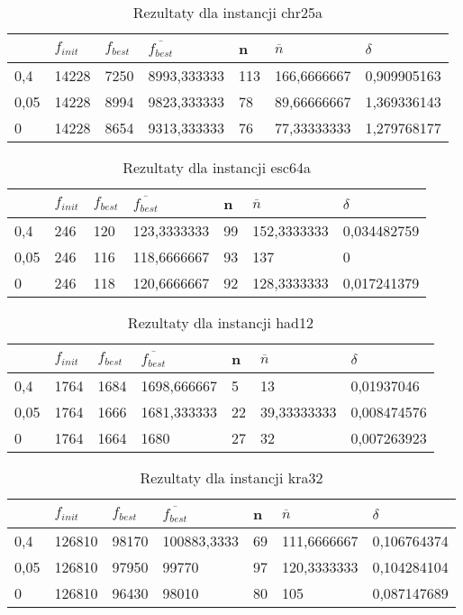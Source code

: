 \begin{table}[H]
\label{T4_chr25a}
\begin{tabular}{l l l l l l l}
\hline
 & $f_{init}$ & $f_{best}$ & $\overline{f_{best}}$ & n & $\overline{n}$ & $\delta$ \\
\hline
0,4 & 14228 & 7250 & 8993,333333 & 113 & 166,6666667 & 0,909905163\\
0,05 & 14228 & 8994 & 9823,333333 & 78 & 89,66666667 & 1,369336143\\
0 & 14228 & 8654 & 9313,333333 & 76 & 77,33333333 & 1,279768177\\
\hline
\end{tabular}
\caption{Rezultaty dla instancji chr25a}
\end{table}

\begin{table}[H]
\label{T4_esc64a}
\begin{tabular}{l l l l l l l}
\hline
 & $f_{init}$ & $f_{best}$ & $\overline{f_{best}}$ & n & $\overline{n}$ & $\delta$ \\
\hline
0,4 & 246 & 120 & 123,3333333 & 99 & 152,3333333 & 0,034482759\\
0,05 & 246 & 116 & 118,6666667 & 93 & 137 & 0\\
0 & 246 & 118 & 120,6666667 & 92 & 128,3333333 & 0,017241379\\
\hline
\end{tabular}
\caption{Rezultaty dla instancji esc64a}
\end{table}

\begin{table}[H]
\label{T4_had12}
\begin{tabular}{l l l l l l l}
\hline
 & $f_{init}$ & $f_{best}$ & $\overline{f_{best}}$ & n & $\overline{n}$ & $\delta$ \\
\hline
0,4 & 1764 & 1684 & 1698,666667 & 5 & 13 & 0,01937046\\
0,05 & 1764 & 1666 & 1681,333333 & 22 & 39,33333333 & 0,008474576\\
0 & 1764 & 1664 & 1680 & 27 & 32 & 0,007263923\\
\hline
\end{tabular}
\caption{Rezultaty dla instancji had12}
\end{table}

\begin{table}[H]
\label{T4_kra32}
\begin{tabular}{l l l l l l l}
\hline
 & $f_{init}$ & $f_{best}$ & $\overline{f_{best}}$ & n & $\overline{n}$ & $\delta$ \\
\hline
0,4 & 126810 & 98170 & 100883,3333 & 69 & 111,6666667 & 0,106764374\\
0,05 & 126810 & 97950 & 99770 & 97 & 120,3333333 & 0,104284104\\
0 & 126810 & 96430 & 98010 & 80 & 105 & 0,087147689\\
\hline
\end{tabular}
\caption{Rezultaty dla instancji kra32}
\end{table}

